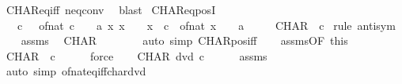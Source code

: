 \begin{isabellebody}
\ CHAR{\isacharunderscore}{\kern0pt}eq{}{\isacharunderscore}{\kern0pt}iff\ neq{}{\isacharunderscore}{\kern0pt}conv\ \isamarkupfalse%
\ blast%
\endisatagproof
{\isafoldproof}%
%
\isadelimproof
\isanewline
%
\endisadelimproof
\isanewline
{}\isamarkupfalse%
\ CHAR{\isacharunderscore}{\kern0pt}eq{\isacharunderscore}{\kern0pt}posI{\isacharcolon}{\kern0pt}\isanewline
\ \ \ {\isachardoublequoteopen}c\ {\isachargreater}{\kern0pt}\ {}{\isachardoublequoteclose}\ {\isachardoublequoteopen}of{\isacharunderscore}{\kern0pt}nat\ c\ {\isacharequal}{\kern0pt}\ {\isacharparenleft}{\kern0pt}{}\ {\isacharcolon}{\kern0pt}{\isacharcolon}{\kern0pt}\ {\isacharprime}{\kern0pt}a{\isacharparenright}{\kern0pt}{\isachardoublequoteclose}\ {\isachardoublequoteopen}{\isasymAnd}x{\isachardot}{\kern0pt}\ x\ {\isachargreater}{\kern0pt}\ {}\ {\isasymLongrightarrow}\ x\ {\isacharless}{\kern0pt}\ c\ {\isasymLongrightarrow}\ of{\isacharunderscore}{\kern0pt}nat\ x\ {\isasymnoteq}\ {\isacharparenleft}{\kern0pt}{}\ {\isacharcolon}{\kern0pt}{\isacharcolon}{\kern0pt}\ {\isacharprime}{\kern0pt}a{\isacharparenright}{\kern0pt}{\isachardoublequoteclose}\isanewline
\ \ \ \ \ {\isachardoublequoteopen}CHAR\ {\isacharequal}{\kern0pt}\ c{\isachardoublequoteclose}\isanewline
%
\isadelimproof
%
\endisadelimproof
%
\isatagproof
{}\isamarkupfalse%
\ {\isacharparenleft}{\kern0pt}rule\ antisym{\isacharparenright}{\kern0pt}\isanewline
\ \ \isamarkupfalse%
\ assms\ \isamarkupfalse%
\ {\isachardoublequoteopen}CHAR\ {\isachargreater}{\kern0pt}\ {}{\isachardoublequoteclose}\isanewline
\ \ \ \ \isamarkupfalse%
\ {\isacharparenleft}{\kern0pt}auto\ simp{\isacharcolon}{\kern0pt}\ CHAR{\isacharunderscore}{\kern0pt}pos{\isacharunderscore}{\kern0pt}iff{\isacharparenright}{\kern0pt}\isanewline
\ \ \isamarkupfalse%
\ assms{\isacharparenleft}{\kern0pt}{}{\isacharparenright}{\kern0pt}{\isacharbrackleft}{\kern0pt}OF\ this{\isacharbrackright}{\kern0pt}\ \isamarkupfalse%
\ {\isachardoublequoteopen}CHAR\ {\isasymge}\ c{\isachardoublequoteclose}\isanewline
\ \ \ \ \isamarkupfalse%
\ force\isanewline
{}\isamarkupfalse%
\isanewline
\ \ \isamarkupfalse%
\ {\isachardoublequoteopen}CHAR\ dvd\ c{\isachardoublequoteclose}\isanewline
\ \ \ \ \isamarkupfalse%
\ assms\ \isamarkupfalse%
\ {\isacharparenleft}{\kern0pt}auto\ simp{\isacharcolon}{\kern0pt}\ of{\isacharunderscore}{\kern0pt}nat{\isacharunderscore}{\kern0pt}eq{\isacharunderscore}{\kern0pt}{}{\isacharunderscore}{\kern0pt}iff{\isacharunderscore}{\kern0pt}char{\isacharunderscore}{\kern0pt}dvd{\isacharparenright}{\kern0pt}\isanewline

\end{isabellebody}
